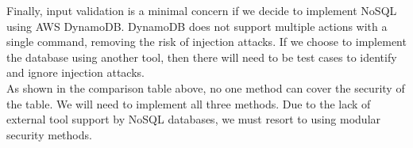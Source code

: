         \noindent Finally, input validation is a minimal concern if we decide to implement NoSQL using AWS DynamoDB. DynamoDB does not support multiple actions with a single command, removing the risk of injection attacks. If we choose to implement the database using another tool, then there will need to be test cases to identify and ignore injection attacks.\\
        
        \noindent As shown in the comparison table above, no one method can cover the security of the table. We will need to implement all three methods. Due to the lack of external tool support by NoSQL databases, we must resort to using modular security methods. 
